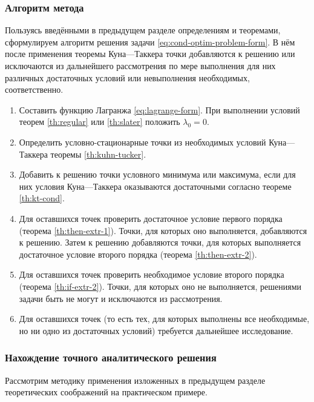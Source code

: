\subsubsection{Алгоритм метода}

Пользуясь введёнными в предыдущем разделе определениям и теоремами,
сформулируем алгоритм решения задачи
\eqref{eq:cond-optim-problem-form}. В нём после применения теоремы
Куна—Таккера точки добавляются к решению или исключаются из
дальнейшего рассмотрения по мере выполнения для них различных
достаточных условий или невыполнения необходимых, соответственно.

\begin{enumerate}
  \renewcommand{\labelenumi}{\textbf{Шаг \arabic{enumi}.}}
\item Составить функцию Лагранжа \eqref{eq:lagrange-form}. При
  выполнении условий теорем \ref{th:regular} или \ref{th:slater}
  положить $\lambda_0 = 0$.
\item Определить условно-стационарные точки из необходимых условий
  Куна—Таккера теоремы \ref{th:kuhn-tucker}.
\item Добавить к решению точки условного минимума или максимума, если
  для них условия Куна—Таккера оказываются достаточными согласно
  теореме \ref{th:kt-cond}.
\item Для оставшихся точек проверить достаточное условие первого
  порядка (теорема \ref{th:then-extr-1}). Точки, для которых оно
  выполняется, добавляются к решению. Затем к решению добавляются
  точки, для которых выполняется достаточное условие второго порядка
  (теорема \ref{th:then-extr-2}).
\item Для оставшихся точек проверить необходимое условие второго
  порядка (теорема \ref{th:if-extr-2}). Точки, для которых оно не
  выполняется, решениями задачи быть не могут и исключаются из
  рассмотрения.
\item Для оставшихся точек (то есть тех, для которых выполнены все
  необходимые, но ни одно из достаточных условий) требуется дальнейшее
  исследование.
\end{enumerate}

\clearpage
\subsubsection{Нахождение точного аналитического решения}

Рассмотрим методику применения изложенных в предыдущем разделе
теоретических соображений на практическом примере.

